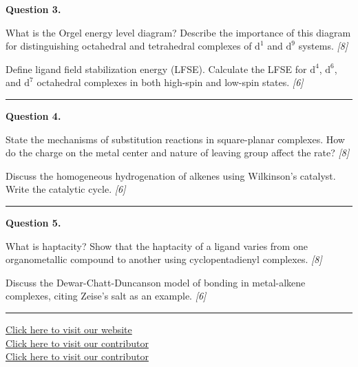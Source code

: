 \documentclass[11pt,a4paper]{article}
\newcommand{\pts}[1]{\hfill   \textit{[#1]}}
\begin{document}
\noindent   \textbf{Question 3.}

\begin{parts}
  \item What is the Orgel energy level diagram? Describe the importance of this diagram for distinguishing octahedral and tetrahedral complexes of $ \text{d}^1$ and $ \text{d}^9$ systems. \pts{8}
  \item Define ligand field stabilization energy (LFSE). Calculate the LFSE for $ \text{d}^4$, $ \text{d}^6$, and $ \text{d}^7$ octahedral complexes in both high-spin and low-spin states. \pts{6}
\end{parts}

\medskip\rule{\linewidth}{0.2pt}




\noindent   \textbf{Question 4.}

\begin{parts}
  \item State the mechanisms of substitution reactions in square-planar complexes. How do the charge on the metal center and nature of leaving group affect the rate? \pts{8}
  \item Discuss the homogeneous hydrogenation of alkenes using Wilkinson's catalyst. Write the catalytic cycle. \pts{6}
\end{parts}

\medskip\rule{\linewidth}{0.2pt}




\noindent   \textbf{Question 5.}

\begin{parts}
  \item What is haptacity? Show that the haptacity of a ligand varies from one organometallic compound to another using cyclopentadienyl complexes. \pts{8}
  \item Discuss the Dewar-Chatt-Duncanson model of bonding in metal-alkene complexes, citing Zeise's salt as an example. \pts{6}
\end{parts}

\vfill
\rule{\linewidth}{0.4pt}

\begin{center}\small
  \href{https://bhu-exam.vercel.app/}{Click here to visit our website}\\[4pt]
  \href{https://me-aryan.vercel.app/}{Click here to visit our contributor}\\[4pt]
  \href{https://quashan-me.vercel.app/}{Click here to visit our contributor}
\end{center}
\end{document}
